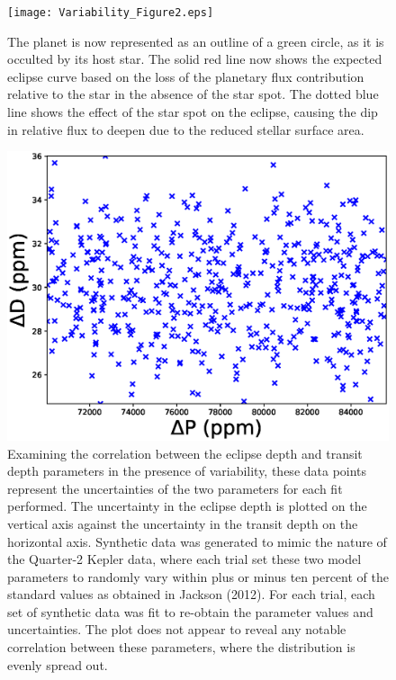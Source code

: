\documentclass[manuscript]{aastex}
\begin{document}
\begin{figure}

\texttt{[image: Variability\_Figure2.eps]}
\caption{The planet is now represented as an outline of a green circle, as it is occulted by its host star. The solid red line now shows the expected eclipse curve based on the loss of the planetary flux contribution relative to the star in the absence of the star spot. The dotted blue line shows the effect of the star spot on the eclipse, causing the dip in relative flux to deepen due to the reduced stellar surface area.
\label{fig:Variability_Figure2}}

\end{figure}


\begin{figure}

\includegraphics[width=1.0\textwidth]{synthetic_correlation_reflect_vary.eps}
\caption{Examining the correlation between the eclipse depth and transit depth parameters in the presence of variability, these data points represent the uncertainties of the two parameters for each fit performed. The uncertainty in the eclipse depth is plotted on the vertical axis against the uncertainty in the transit depth on the horizontal axis. Synthetic data was generated to mimic the nature of the Quarter-2 Kepler data, where each trial set these two model parameters to randomly vary within plus or minus ten percent of the standard values as obtained in Jackson (2012). For each trial, each set of synthetic data was fit to re-obtain the parameter values and uncertainties. The plot does not appear to reveal any notable correlation between these parameters, where the distribution is evenly spread out.}

\end{figure}
\end{document}
